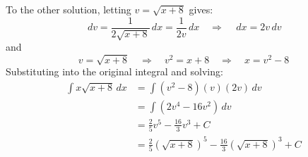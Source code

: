 \documentclass[nooutcomes, handout]{ximera}
\renewcommand{\d}{\,d}
\begin{document}
\begin{problem}[warmup]
\begin{freeResponse}
                  To the other solution, letting $v=\sqrt{x+8}$ gives:
                  \begin{equation*}
                    \d v = \frac{1}{2 \sqrt{x+8}} \d x = \frac{1}{2v} \d x 	\quad	\Longrightarrow \quad \d x = 2v \d v
                  \end{equation*}
                  and
                  \begin{equation*}
                    v = \sqrt{x+8} \quad \Longrightarrow \quad v^2 = x+8 \quad \Longrightarrow \quad x= v^2-8
                  \end{equation*}
                  Substituting into the original integral and solving:
                  \begin{align*}
                    \int x \sqrt{x+8} \d x &= \int (v^2-8)(v)(2v)\d v  \\
                                           &= \int (2v^4 - 16v^2) \d v  \\
                                           &= \frac{2}{5} v^5 - \frac{16}{3} v^3 + C  \\
                                           &= \frac{2}{5} (\sqrt{x+8})^5 - \frac{16}{3} (\sqrt{x+8})^3 + C
                  \end{align*}
		
		\end{freeResponse}
              \end{problem}
\end{document}
